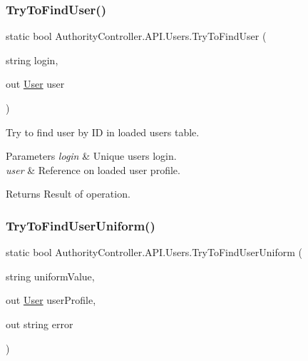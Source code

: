 \subsubsection{\texorpdfstring{Try\+To\+Find\+User()}{TryToFindUser()}\hspace{0.1cm}{\footnotesize\ttfamily [2/2]}}
{\footnotesize\ttfamily static bool Authority\+Controller.\+A\+P\+I.\+Users.\+Try\+To\+Find\+User (\begin{DoxyParamCaption}\item[{string}]{login,  }\item[{out \mbox{\hyperlink{class_authority_controller_1_1_data_1_1_personal_1_1_user}{User}}}]{user }\end{DoxyParamCaption})\hspace{0.3cm}{\ttfamily [static]}}



Try to find user by ID in loaded users table. 


\begin{DoxyParams}{Parameters}
{\em login} & Unique user\textquotesingle{}s login.\\
\hline
{\em user} & Reference on loaded user profile.\\
\hline
\end{DoxyParams}
\begin{DoxyReturn}{Returns}
Result of operation.
\end{DoxyReturn}
\mbox{\label{class_authority_controller_1_1_a_p_i_1_1_users_a7890ae58af943645c6b6cfc39f0d3e6f}} 
\subsubsection{\texorpdfstring{Try\+To\+Find\+User\+Uniform()}{TryToFindUserUniform()}}
{\footnotesize\ttfamily static bool Authority\+Controller.\+A\+P\+I.\+Users.\+Try\+To\+Find\+User\+Uniform (\begin{DoxyParamCaption}\item[{string}]{uniform\+Value,  }\item[{out \mbox{\hyperlink{class_authority_controller_1_1_data_1_1_personal_1_1_user}{User}}}]{user\+Profile,  }\item[{out string}]{error }\end{DoxyParamCaption})\hspace{0.3cm}{\ttfamily [static]}}



